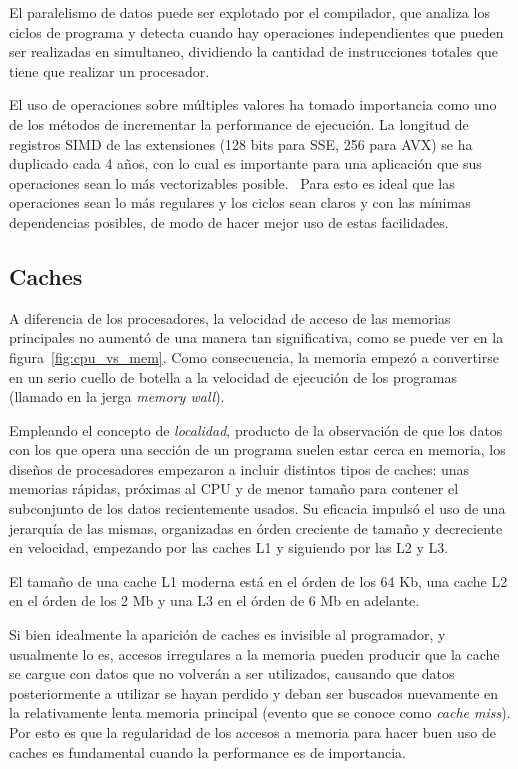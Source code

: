 El paralelismo de datos puede ser explotado por el compilador, que analiza los ciclos de programa y detecta cuando hay operaciones
independientes que pueden ser realizadas en simultaneo, dividiendo la cantidad de instrucciones totales que tiene que realizar
un procesador.

El uso de operaciones sobre m\'ultiples valores ha tomado importancia como uno de los m\'etodos de incrementar
la performance de ejecuci\'on. La longitud de registros SIMD de las extensiones (128 bits para SSE, 256 para AVX)
se ha duplicado cada 4 a\~nos, con lo cual es importante para una aplicaci\'on que sus operaciones sean lo m\'as
vectorizables posible.~\cite{HennessyPatterson} Para esto es ideal que las operaciones sean lo m\'as regulares y
los ciclos sean claros y con las m\'inimas dependencias posibles, de modo de hacer mejor uso de estas facilidades.

\subsection{Caches}

A diferencia de los procesadores, la velocidad de acceso de las memorias principales no aument\'o de una manera
tan significativa, como se puede ver en la figura~\ref{fig:cpu_vs_mem}. Como consecuencia, la memoria
empez\'o a convertirse en un serio cuello de botella a la velocidad de ejecuci\'on de los programas (llamado
en la jerga \textit{memory wall}).

Empleando el concepto de \textit{localidad}, producto de la observaci\'on de que los datos con los que opera una
secci\'on de un programa suelen estar cerca en memoria, los dise\~nos de procesadores empezaron a incluir distintos
tipos de caches: unas memorias r\'apidas, pr\'oximas al CPU y de menor tama\~no para contener el subconjunto de los datos
recientemente usados. Su eficacia impuls\'o el uso de una jerarqu\'ia de las mismas, organizadas en \'orden creciente
de tama\~no y decreciente en velocidad, empezando por las caches L1 y siguiendo por las L2 y L3.

El tama\~no de una cache L1 moderna est\'a en el \'orden de los 64 Kb, una cache L2 en el \'orden de los 2 Mb y
una L3 en el \'orden de 6 Mb en adelante.

Si bien idealmente la aparici\'on de caches es invisible al programador, y usualmente lo es, accesos irregulares a la
memoria pueden producir que la cache se cargue con datos que no volver\'an a ser utilizados, causando que datos posteriormente
a utilizar se hayan perdido y deban ser buscados nuevamente en la relativamente lenta memoria principal (evento que se conoce como
\textit{cache miss}). Por esto es que la regularidad de los accesos a memoria para hacer buen uso de caches es
fundamental cuando la performance es de importancia.


